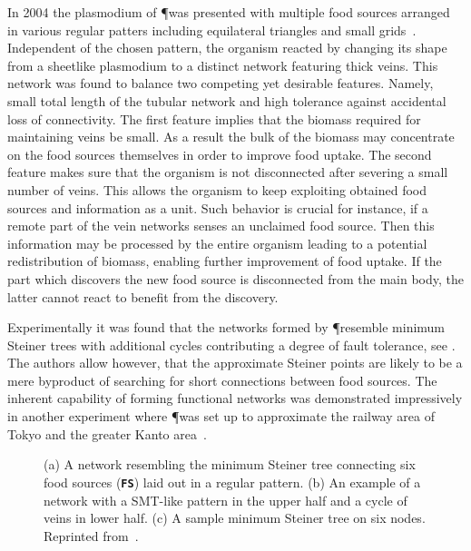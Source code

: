 			In 2004 the plasmodium of \P was presented with multiple food sources arranged in various regular patters including equilateral triangles and small grids~\cite{Nakagaki20041,nakagaki2004obtaining}. Independent of the chosen pattern, the organism reacted by changing its shape from a sheetlike plasmodium to a distinct network featuring thick veins. This network was found to balance two competing yet desirable features. Namely, small total length of the tubular network and high tolerance against accidental loss of connectivity. The first feature implies that the biomass required for maintaining veins be small. As a result the bulk of the biomass may concentrate on the food sources themselves in order to improve food uptake. The second feature makes sure that the organism is not disconnected after severing a small number of veins. This allows the organism to keep exploiting obtained food sources and information as a unit. Such behavior is crucial for instance, if a remote part of the vein networks senses an unclaimed food source. Then this information may be processed by the entire organism leading to a potential redistribution of biomass, enabling further improvement of food uptake. If the part which discovers the new food source is disconnected from the main body, the latter cannot react to benefit from the discovery.

			Experimentally it was found that the networks formed by \P resemble minimum Steiner trees with additional cycles contributing a degree of fault tolerance, see . The authors allow however, that the approximate Steiner points are likely to be a mere byproduct of searching for short connections between food sources. The inherent capability of forming functional networks was demonstrated impressively in another experiment where \P was set up to approximate the railway area of Tokyo and the greater Kanto area~\cite{tero2010rules}.

			\begin{figure}
				\centering
				\caption[Network of food sources by \P]{ (a) A network resembling the minimum Steiner tree connecting six food sources (\textbf{\texttt{FS}}) laid out in a regular pattern. (b) An example of a network with a SMT-like pattern in the upper half and a cycle of veins in lower half. (c) A sample minimum Steiner tree on six nodes. Reprinted from~\cite{nakagaki2004obtaining}.}
				\label{fig:steiner_tree_experiment}
			\end{figure}

